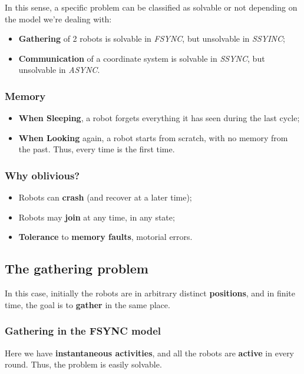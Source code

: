 In this sense, a specific problem can be classified as solvable or not depending on the model we're dealing with:
\begin{itemize}
    \item \textbf{Gathering} of 2 robots is solvable in \textit{FSYNC}, but unsolvable in \textit{SSYINC};
    \item \textbf{Communication} of a coordinate system is solvable in \textit{SSYNC}, but unsolvable in \textit{ASYNC}.
\end{itemize}

\subsubsection{Memory}
\begin{itemize}
    \item \textbf{When Sleeping}, a robot forgets everything it has seen during the last cycle;
    \item \textbf{When Looking} again, a robot starts from scratch, with no memory from the past. Thus, every time is the first time.
\end{itemize}

\subsubsection{Why oblivious?}
\begin{itemize}
    \item Robots can \textbf{crash} (and recover at a later time);
    \item Robots may \textbf{join} at any time, in any state;
    \item \textbf{Tolerance} to \textbf{memory faults}, motorial errors.
\end{itemize}

\subsection{The gathering problem}
In this case, initially the robots are in arbitrary distinct \textbf{positions}, and in finite time, the goal is to \textbf{gather} in the same place.

\subsubsection{Gathering in the FSYNC model}
Here we have \textbf{instantaneous activities}, and all the robots are \textbf{active} in every round. Thus, the problem is easily solvable.

